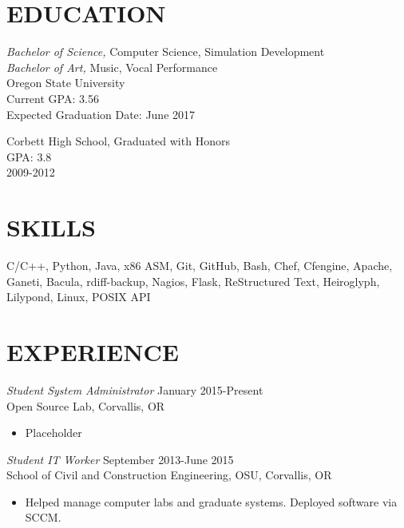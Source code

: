 \documentclass[line,margin]{res}
\begin{document}
\address{(503)-758-6952, fahlmantaylor@gmail.com}
\address{tfahl.com, github.com/fahlmant, irc: recyclops/fahlmant on freenode}
\begin{resume}
 
\section{EDUCATION}
                    {\sl Bachelor of Science,} Computer Science, Simulation Development \\
                    {\sl Bachelor of Art,} Music, Vocal Performance \\
                    Oregon State University\\
                    Current GPA: 3.56\\
                    Expected Graduation Date: June 2017 
                    
                    Corbett High School,
                    Graduated with Honors\\
                    GPA: 3.8\\
                    2009-2012
\section{SKILLS}
                    C/C++, Python, Java, x86 ASM, Git, GitHub, Bash, Chef, Cfengine, Apache, Ganeti, Bacula, rdiff-backup,
                    Nagios, Flask, ReStructured Text, Heiroglyph, Lilypond, Linux, POSIX API
\section{EXPERIENCE}
                    {\sl Student System Administrator} \hfill January 2015-Present \\
                    Open Source Lab, 
                    Corvallis, OR
                    \begin{itemize}  \itemsep -2pt %
                       \item Placeholder
                    \end{itemize}
 
                    {\sl Student IT Worker} \hfill September 2013-June 2015 \\
                    School of Civil and Construction Engineering, OSU, 
                    Corvallis, OR 
                    \begin{itemize}  \itemsep -2pt %
                       \item Helped manage computer labs and graduate systems. Deployed software via SCCM.
                    \end{itemize} 


\end{resume}
\end{document}
